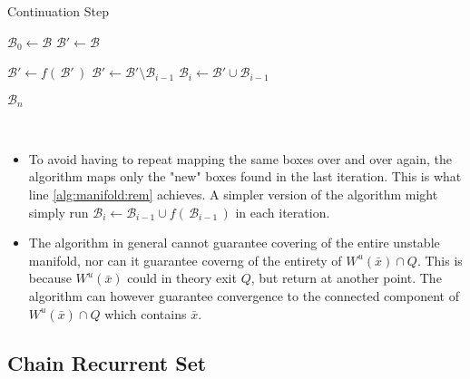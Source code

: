 \begin{algorithm}
    \caption{Continuation Step}
    \label{alg:manifold}
    \begin{algorithmic}[1]
        \State $\mathcal{B}_0 \gets \mathcal{B}$
        \State $\mathcal{B}' \gets \mathcal{B}$

            \State $\mathcal{B}' \gets f(\,\mathcal{B}'\,)$
            \State $\mathcal{B}' \gets \mathcal{B}' \setminus \mathcal{B}_{i-1}$ 
            \label{alg:manifold:rem}
            \State $\mathcal{B}_i \gets \mathcal{B}' \cup \mathcal{B}_{i-1}$
        \EndFor

        \State \Return $\mathcal{B}_{n}$
    \end{algorithmic}
\end{algorithm}

\begin{remark}\ 
    \begin{itemize}
        \item To avoid having to repeat mapping the same boxes over and over again, 
        the algorithm maps only the "new" boxes found in the last iteration. This is what 
        line \ref{alg:manifold:rem} achieves. A simpler version of the algorithm might simply run 
        $\mathcal{B}_i \gets \mathcal{B}_{i-1} \cup f(\,\mathcal{B}_{i-1}\,)$
        in each iteration.
        \item \cite*{manifold} The algorithm in general cannot guarantee covering of the 
        entire unstable manifold, nor can it guarantee coverng of the entirety of 
        $W^u(\bar{x}) \cap Q$. This is because $W^u(\bar{x})$ could in theory exit $Q$, 
        but return at another point. The algorithm can however guarantee convergence 
        to the connected component of $W^u(\bar{x}) \cap Q$ which contains $\bar{x}$.
    \end{itemize}
\end{remark}


\subsection{Chain Recurrent Set}

